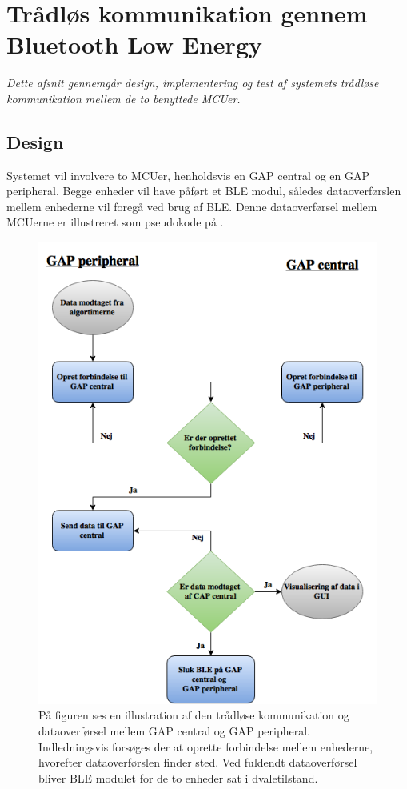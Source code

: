 \section{Trådløs kommunikation gennem Bluetooth Low Energy}
\textit{Dette afsnit gennemgår design, implementering og test af systemets trådløse kommunikation mellem de to benyttede MCUer.}

\subsection{Design}
Systemet vil involvere to MCUer, henholdsvis en GAP central og en GAP peripheral. Begge enheder vil have påført et BLE modul, således dataoverførslen mellem enhederne vil foregå ved brug af BLE. Denne dataoverførsel mellem MCUerne er illustreret som pseudokode på . 
\begin{figure}[H]
	\centering
	\includegraphics[scale=0.5]{figures/cDesign/blue_pseudo.png}
	\caption{På figuren ses en illustration af den trådløse kommunikation og dataoverførsel mellem GAP central og GAP peripheral. Indledningsvis forsøges der at oprette forbindelse mellem enhederne, hvorefter dataoverførslen finder sted. Ved fuldendt dataoverførsel bliver BLE modulet for de to enheder sat i dvaletilstand.}
	\label{fig:blue_pseudo}
\end{figure}
